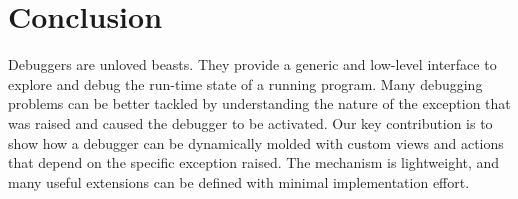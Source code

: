 \documentclass[sigplan,anonymous,review,10pt]{acmart}
\begin{document}
\section{Conclusion}\label{sec:conclusion}

Debuggers are unloved beasts.
They provide a generic and low-level interface to explore and debug the run-time state of a running program.
Many debugging problems can be better tackled by understanding the nature of the exception that was raised and caused the debugger to be activated.
Our key contribution is to show how a debugger can be dynamically molded with custom views and actions that depend on the specific exception raised.
The mechanism is lightweight, and many useful extensions can be defined with minimal implementation effort.




\end{document}
